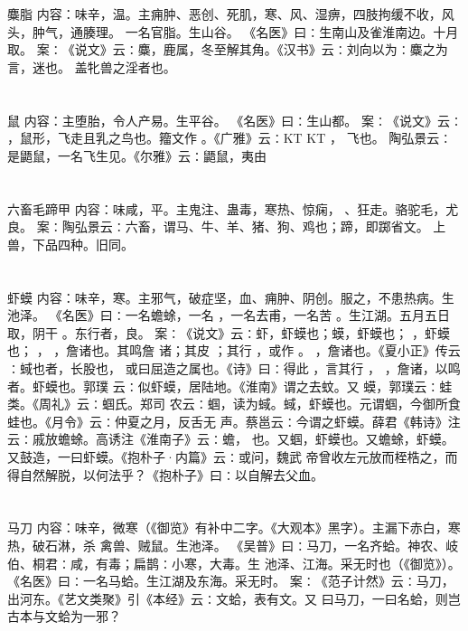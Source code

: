\documentclass[12pt,UTF8]{ctexbook}
\begin{document}
\section{}麋脂
内容：味辛，温。主痈肿、恶创、死肌，寒、风、湿痹，四肢拘缓不收，风头，肿气，通腠理。 
一名官脂。生山谷。 
《名医》曰∶生南山及雀淮南边。十月取。 
案∶《说文》云∶麋，鹿属，冬至解其角。《汉书》云∶刘向以为∶麋之为言，迷也。 
盖牝兽之淫者也。 


\section{}鼠
内容：主堕胎，令人产易。生平谷。 
《名医》曰∶生山都。 
案∶《说文》云∶ ，鼠形，飞走且乳之鸟也。籀文作 。《广雅》云∶KT KT ， 
飞也。 
陶弘景云∶是鼯鼠，一名飞生见。《尔雅》云∶鼯鼠，夷由 


\section{}六畜毛蹄甲
内容：味咸，平。主鬼注、蛊毒，寒热、惊痫， 、狂走。骆驼毛，尤良。 
案∶陶弘景云∶六畜，谓马、牛、羊、猪、狗、鸡也；蹄，即踯省文。 
上兽，下品四种。旧同。 


\section{}虾蟆
内容：味辛，寒。主邪气，破症坚，血、痈肿、阴创。服之，不患热病。生池泽。 
《名医》曰∶一名蟾蜍，一名 ，一名去甫，一名苦 。生江湖。五月五日取，阴干 
。东行者，良。 
案∶《说文》云∶虾，虾蟆也；蟆，虾蟆也； ，虾蟆也； ， ，詹诸也。其鸣詹 
诸；其皮 ；其行 ，或作 。 ，詹诸也。《夏小正》传云∶蜮也者，长股也， 
或曰屈造之属也。《诗》曰∶得此 ，言其行 ， ，詹诸，以鸣者。虾蟆也。郭璞 
云∶似虾蟆，居陆地。《淮南》谓之去蚊。又 蟆，郭璞云∶蛙类。《周礼》云∶蝈氏。郑司 
农云∶蝈，读为蜮。蜮，虾蟆也。元谓蝈，今御所食蛙也。《月令》云∶仲夏之月，反舌无 
声。蔡邕云∶今谓之虾蟆。薛君《韩诗》注云∶戚放蟾蜍。高诱注《淮南子》云∶蟾， 
也。又蝈，虾蟆也。又蟾蜍，虾蟆。又鼓造，一曰虾蟆。《抱朴子·内篇》云∶或问，魏武 
帝曾收左元放而桎梏之，而得自然解脱，以何法乎？《抱朴子》曰∶以自解去父血。 


\section{}马刀
内容：味辛，微寒（《御览》有补中二字。《大观本》黑字）。主漏下赤白，寒热，破石淋，杀 
禽兽、贼鼠。生池泽。 
《吴普》曰∶马刀，一名齐蛤。神农、岐伯、桐君∶咸，有毒；扁鹊∶小寒，大毒。生 
池泽、江海。采无时也（《御览》）。 
《名医》曰∶一名马蛤。生江湖及东海。采无时。 
案∶《范子计然》云∶马刀，出河东。《艺文类聚》引《本经》云∶文蛤，表有文。又 
曰马刀，一曰名蛤，则岂古本与文蛤为一邪？ 
\end{document}
